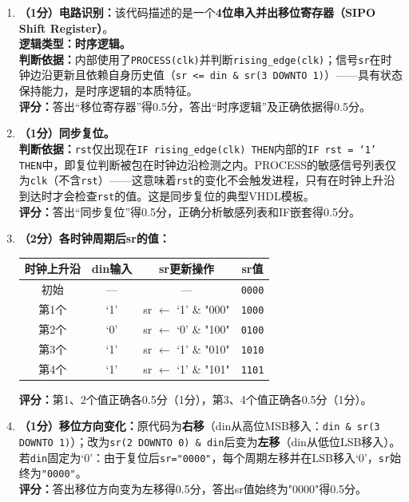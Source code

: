 \begin{enumerate}[label=(\arabic*)]

\item \textbf{（1分）电路识别：}该代码描述的是一个\textbf{4位串入并出移位寄存器（SIPO Shift Register）}。\\
\textbf{逻辑类型：时序逻辑。}\\
\textbf{判断依据：}内部使用了\texttt{PROCESS(clk)}并判断\texttt{rising\_edge(clk)}；信号\texttt{sr}在时钟边沿更新且依赖自身历史值（\texttt{sr <= din \& sr(3 DOWNTO 1)}）——具有状态保持能力，是时序逻辑的本质特征。\\
\textbf{评分：}答出“移位寄存器”得0.5分，答出“时序逻辑”及正确依据得0.5分。

\item \textbf{（1分）同步复位。}\\
\textbf{判断依据：}\texttt{rst}仅出现在\texttt{IF rising\_edge(clk) THEN}内部的\texttt{IF rst = `1' THEN}中，即复位判断被包在时钟边沿检测之内。PROCESS的敏感信号列表仅为\texttt{clk}（不含\texttt{rst}）——这意味着\texttt{rst}的变化不会触发进程，只有在时钟上升沿到达时才会检查\texttt{rst}的值。这是同步复位的典型VHDL模板。\\
\textbf{评分：}答出“同步复位”得0.5分，正确分析敏感列表和IF嵌套得0.5分。

\item \textbf{（2分）各时钟周期后sr的值：}

\begin{table}[h]
\centering
\begin{tabular}{|c|c|c|c|}
\hline
\textbf{时钟上升沿} & \textbf{din输入} & \textbf{sr更新操作} & \textbf{sr值} \\
\hline
初始 & — & — & \texttt{0000} \\
第1个 & `1' & sr $\leftarrow$ `1' \& "000" & \texttt{1000} \\
第2个 & `0' & sr $\leftarrow$ `0' \& "100" & \texttt{0100} \\
第3个 & `1' & sr $\leftarrow$ `1' \& "010" & \texttt{1010} \\
第4个 & `1' & sr $\leftarrow$ `1' \& "101" & \texttt{1101} \\
\hline
\end{tabular}
\end{table}

\textbf{评分：}第1、2个值正确各0.5分（1分），第3、4个值正确各0.5分（1分）。

\item \textbf{（1分）移位方向变化：}原代码为\textbf{右移}（din从高位MSB移入：\texttt{din \& sr(3 DOWNTO 1)}）；改为\texttt{sr(2 DOWNTO 0) \& din}后变为\textbf{左移}（din从低位LSB移入）。\\
若\texttt{din}固定为`0'：由于复位后\texttt{sr="0000"}，每个周期左移并在LSB移入`0'，\texttt{sr}始终为\texttt{"0000"}。\\
\textbf{评分：}答出移位方向变为左移得0.5分，答出sr值始终为"0000"得0.5分。

\end{enumerate}

